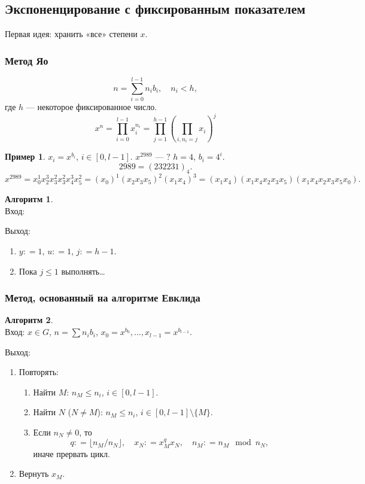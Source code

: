\documentclass[12pt]{article}%
\renewcommand{\leq}{\leqslant}
\newcommand{\coleq}{\ensuremath{\mathrel{\mathop:}=}}
\newcommand{\nspace}{\hspace{0pt}}
\theoremstyle{remark}
\theoremstyle{definition}
\newtheorem{Ex}{Пример}
\newtheorem{NumAlgo}{Алгоритм}
\begin{document}
\subsection{Экспоненцирование с фиксированным показателем}
Первая идея: хранить «все» степени $x$.

\subsubsection{Метод Яо}
$$
    n = \sum_{i=0}^{l-1}n_i b_i, \quad n_i < h, 
$$
где $h$ — некоторое фиксированное число.
$$
    x^n = \prod_{i=0}^{l-1}x_i^{n_i}
        = \prod_{j = 1}^{h-1} \left ( \prod_{i, n_i = j} x_i \right )^j
$$
\begin{Ex}
$x_i = x^{b_i}$, $i \in [0, l-1]$. $x^{2989}$ — ? $h=4$, $b_i = 4^i$.
$$ 2989 =(232231)_4. $$
$$
    x^{2989} = x_0^1 x_2^3 x_3^2 x_3^2 x_4^3 x_5^2 = 
    (x_0)^1(x_2x_3x_5)^2 (x_1x_4)^3 =
    (x_1x_4)(x_1x_4x_2x_3x_5)(x_1x_4x_2x_3x_5x_0).
$$
\end{Ex}

\begin{NumAlgo}\nspace\\

Вход:

Выход:

\begin{enumerate}
  \item $y \coleq 1$, $u \coleq 1$, $j \coleq h - 1$.
  \item Пока $j \leqslant 1$ выполнять…
\end{enumerate}
\end{NumAlgo}
\subsubsection{Метод, основанный на алгоритме Евклида}
\begin{NumAlgo}\nspace\\

Вход: $x \in G$, $n = \sum n_i b_i$, $x_0 = x^{b_0}, \ldots , x_{l-1} =
x^{b_{l-1}}$.

Выход:

\begin{enumerate}
  \item Повторять:
    \begin{enumerate}
        \item Найти $M$: $n_M \leq n_i$, $i \in [0, l-1]$.
        \item Найти $N$ ($N \neq M$):
            $n_M \leqslant n_i$, $i \in [0, l-1] \setminus \{ M \}$.
        \item Если $n_N \neq 0$, то
        $$ 
            q \coleq \lfloor n_M / n_N \rfloor, \quad x_N \coleq x_M^q x_N, \quad 
            n_M \coleq n_M \mod n_N, 
        $$
        иначе прервать цикл.
    \end{enumerate}
    \item Вернуть $x_M$.
\end{enumerate}
\end{NumAlgo}
\end{document}
